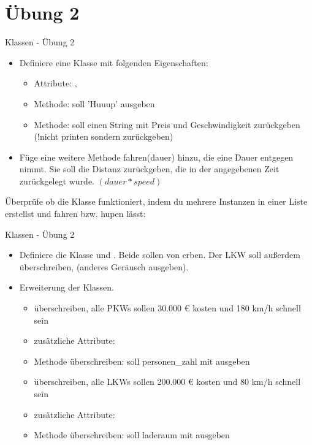 \section{Übung 2}
\begin{frame}{Klassen - Übung 2}
	\begin{itemize}
		\item[1.] Definiere eine Klasse  mit folgenden Eigenschaften: 
		\begin{itemize}
			\item Attribute: , 
			\item Methode:  soll 'Huuup' ausgeben
			\item Methode:  soll einen String mit Preis und Geschwindigkeit zurückgeben (!nicht printen sondern zurückgeben) 
		\end{itemize}
		
		\item[2.] Füge eine weitere Methode \alert{fahren(dauer)} hinzu, die eine \alert{Dauer} entgegen nimmt. Sie soll die Distanz zurückgeben, die in der angegebenen Zeit zurückgelegt wurde. $(dauer * speed)$
	\end{itemize}
	Überprüfe ob die Klasse funktioniert, indem du mehrere Instanzen in einer Liste erstellst und fahren bzw. hupen lässt:
	

\end{frame}


\begin{frame}{Klassen - Übung 2}
	\begin{itemize}
		
		
		\item[3.] 
		Definiere die Klasse  und . Beide sollen von  erben.
		Der LKW soll außerdem  überschreiben, (anderes Geräusch ausgeben).
		
		\item[4.] 
			Erweiterung der Klassen.\linebreak
			\begin{itemize}
				\item {} überschreiben, alle PKWs sollen 30.000 € kosten und 180 km/h schnell sein
				\item zusätzliche Attribute: 
				\item {} Methode überschreiben: soll personen\_zahl mit ausgeben
			\end{itemize}
		
			\begin{itemize}
				\item {} überschreiben, alle LKWs sollen 200.000 € kosten und 80 km/h schnell sein
				\item zusätzliche Attribute: 
				\item {} Methode überschreiben: soll laderaum mit ausgeben
			\end{itemize}
	\end{itemize}
\end{frame}

